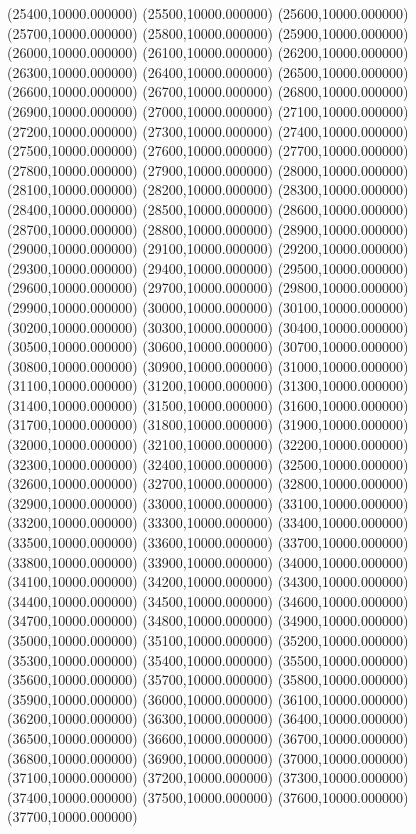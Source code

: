 (25400,10000.000000)
(25500,10000.000000)
(25600,10000.000000)
(25700,10000.000000)
(25800,10000.000000)
(25900,10000.000000)
(26000,10000.000000)
(26100,10000.000000)
(26200,10000.000000)
(26300,10000.000000)
(26400,10000.000000)
(26500,10000.000000)
(26600,10000.000000)
(26700,10000.000000)
(26800,10000.000000)
(26900,10000.000000)
(27000,10000.000000)
(27100,10000.000000)
(27200,10000.000000)
(27300,10000.000000)
(27400,10000.000000)
(27500,10000.000000)
(27600,10000.000000)
(27700,10000.000000)
(27800,10000.000000)
(27900,10000.000000)
(28000,10000.000000)
(28100,10000.000000)
(28200,10000.000000)
(28300,10000.000000)
(28400,10000.000000)
(28500,10000.000000)
(28600,10000.000000)
(28700,10000.000000)
(28800,10000.000000)
(28900,10000.000000)
(29000,10000.000000)
(29100,10000.000000)
(29200,10000.000000)
(29300,10000.000000)
(29400,10000.000000)
(29500,10000.000000)
(29600,10000.000000)
(29700,10000.000000)
(29800,10000.000000)
(29900,10000.000000)
(30000,10000.000000)
(30100,10000.000000)
(30200,10000.000000)
(30300,10000.000000)
(30400,10000.000000)
(30500,10000.000000)
(30600,10000.000000)
(30700,10000.000000)
(30800,10000.000000)
(30900,10000.000000)
(31000,10000.000000)
(31100,10000.000000)
(31200,10000.000000)
(31300,10000.000000)
(31400,10000.000000)
(31500,10000.000000)
(31600,10000.000000)
(31700,10000.000000)
(31800,10000.000000)
(31900,10000.000000)
(32000,10000.000000)
(32100,10000.000000)
(32200,10000.000000)
(32300,10000.000000)
(32400,10000.000000)
(32500,10000.000000)
(32600,10000.000000)
(32700,10000.000000)
(32800,10000.000000)
(32900,10000.000000)
(33000,10000.000000)
(33100,10000.000000)
(33200,10000.000000)
(33300,10000.000000)
(33400,10000.000000)
(33500,10000.000000)
(33600,10000.000000)
(33700,10000.000000)
(33800,10000.000000)
(33900,10000.000000)
(34000,10000.000000)
(34100,10000.000000)
(34200,10000.000000)
(34300,10000.000000)
(34400,10000.000000)
(34500,10000.000000)
(34600,10000.000000)
(34700,10000.000000)
(34800,10000.000000)
(34900,10000.000000)
(35000,10000.000000)
(35100,10000.000000)
(35200,10000.000000)
(35300,10000.000000)
(35400,10000.000000)
(35500,10000.000000)
(35600,10000.000000)
(35700,10000.000000)
(35800,10000.000000)
(35900,10000.000000)
(36000,10000.000000)
(36100,10000.000000)
(36200,10000.000000)
(36300,10000.000000)
(36400,10000.000000)
(36500,10000.000000)
(36600,10000.000000)
(36700,10000.000000)
(36800,10000.000000)
(36900,10000.000000)
(37000,10000.000000)
(37100,10000.000000)
(37200,10000.000000)
(37300,10000.000000)
(37400,10000.000000)
(37500,10000.000000)
(37600,10000.000000)
(37700,10000.000000)
